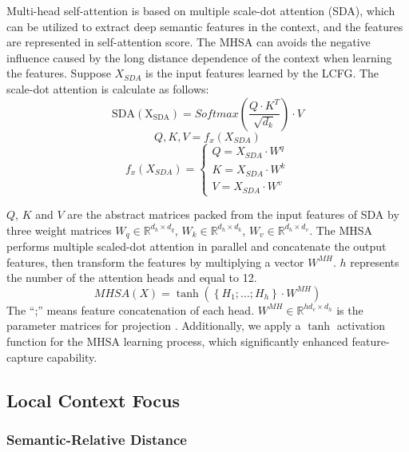 \documentclass[a4paper,fleqn]{cas-sc}
\begin{document}
Multi-head self-attention is based on multiple scale-dot attention (SDA), which can be utilized to extract deep semantic features in the context, and the features are represented in self-attention score. The MHSA can avoids the negative influence caused by the long distance dependence of the context when learning the features.
Suppose $X_{SDA}$ is the input features learned by the LCFG. The scale-dot attention is calculate as follows:
\begin{equation}
\mathrm{SDA(X_{SDA})}=Softmax\left(\frac{Q \cdot K^{T}}{\sqrt{d_{k}}}\right) \cdot V 
\end{equation}
\begin{equation}
Q, K, V=f_{x}(X_{SDA})
\end{equation}
\begin{equation}
f_{x}(X_{SDA})=\left\{\begin{array}{l}{Q=X_{SDA} \cdot W^{q}} \\ {K=X_{SDA} \cdot W^{k}} \\ {V=X_{SDA} \cdot W^{v}}\end{array}\right.
\end{equation}

$Q$, $K$ and $V$ are the abstract matrices packed from the input features of SDA by three weight matrices $W_{q} \in \mathbb{R}^{d_{h} \times d_{q}}$, $W_{k} \in \mathbb{R}^{d_{h} \times d_{k}}$, $W_{v} \in \mathbb{R}^{d_{h} \times d_{v}}$. The MHSA performs multiple scaled-dot attention in parallel and concatenate the output features, then transform the features by multiplying a vector $W^{M H}$. $h$ represents the number of the attention heads and equal to 12. 
\begin{equation}
MHSA(X)=\tanh\left(\left\{H_{1};\ldots;H_{h}\right\}\cdot W^{MH}\right)
\end{equation}
The ``;'' means feature concatenation of each head. $W^{M H} \in \mathbb{R}^{hd_{v} \times d_{h}}$ is the parameter matrices for projection . Additionally, we apply a $\tanh$ activation function for the MHSA learning process, which significantly enhanced feature-capture capability.


\subsection{Local Context Focus}

\subsubsection{Semantic-Relative Distance}
\label{sec:SRD}
\end{document}
